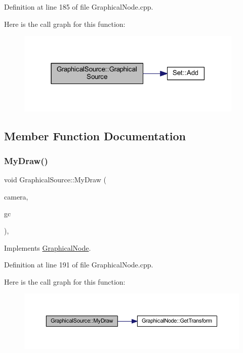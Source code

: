 Definition at line 185 of file Graphical\+Node.\+cpp.

Here is the call graph for this function\+:
\nopagebreak
\begin{figure}[H]
\begin{center}
\leavevmode
\includegraphics[width=307pt]{class_graphical_source_ad557a50f4519460a53e8f7b6f4b21f5b_cgraph}
\end{center}
\end{figure}


\subsection{Member Function Documentation}
\mbox{\label{class_graphical_source_af01b1de06f0e6653edd60b59a279b154}} 
\subsubsection{\texorpdfstring{My\+Draw()}{MyDraw()}}
{\footnotesize\ttfamily void Graphical\+Source\+::\+My\+Draw (\begin{DoxyParamCaption}\item[{const wx\+Affine\+Matrix2D \&}]{camera,  }\item[{wx\+Graphics\+Context $\ast$}]{gc }\end{DoxyParamCaption})\hspace{0.3cm}{\ttfamily [override]}, {\ttfamily [virtual]}}



Implements \hyperlink{class_graphical_node_a4a5d4f48454a9721a940499d4f59b0ce}{Graphical\+Node}.



Definition at line 191 of file Graphical\+Node.\+cpp.

Here is the call graph for this function\+:
\nopagebreak
\begin{figure}[H]
\begin{center}
\leavevmode
\includegraphics[width=350pt]{class_graphical_source_af01b1de06f0e6653edd60b59a279b154_cgraph}
\end{center}
\end{figure}


